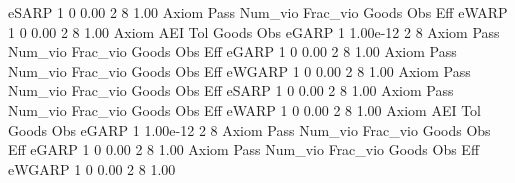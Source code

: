        eSARP {\VBAR}    1           0        0.00           2           8        1.00  
{\smallskip}
{\smallskip}
{\smallskip}
       Axiom {\VBAR} Pass     Num_vio    Frac_vio       Goods         Obs         Eff  
       eWARP {\VBAR}    1           0        0.00           2           8        1.00  
{\smallskip}
       Axiom {\VBAR}       AEI        Tol      Goods        Obs 
       eGARP {\VBAR}         1   1.00e-12          2          8 
{\smallskip}
{\smallskip}
{\smallskip}
       Axiom {\VBAR} Pass     Num_vio    Frac_vio       Goods         Obs         Eff  
       eGARP {\VBAR}    1           0        0.00           2           8        1.00  
{\smallskip}
{\smallskip}
{\smallskip}
       Axiom {\VBAR} Pass     Num_vio    Frac_vio       Goods         Obs         Eff  
      eWGARP {\VBAR}    1           0        0.00           2           8        1.00  
{\smallskip}
{\smallskip}
{\smallskip}
       Axiom {\VBAR} Pass     Num_vio    Frac_vio       Goods         Obs         Eff  
       eSARP {\VBAR}    1           0        0.00           2           8        1.00  
{\smallskip}
{\smallskip}
{\smallskip}
       Axiom {\VBAR} Pass     Num_vio    Frac_vio       Goods         Obs         Eff  
       eWARP {\VBAR}    1           0        0.00           2           8        1.00  
{\smallskip}
       Axiom {\VBAR}       AEI        Tol      Goods        Obs 
       eGARP {\VBAR}         1   1.00e-12          2          8 
{\smallskip}
{\smallskip}
{\smallskip}
       Axiom {\VBAR} Pass     Num_vio    Frac_vio       Goods         Obs         Eff  
       eGARP {\VBAR}    1           0        0.00           2           8        1.00  
{\smallskip}
{\smallskip}
{\smallskip}
       Axiom {\VBAR} Pass     Num_vio    Frac_vio       Goods         Obs         Eff  
      eWGARP {\VBAR}    1           0        0.00           2           8        1.00  
{\smallskip}
{\smallskip}
